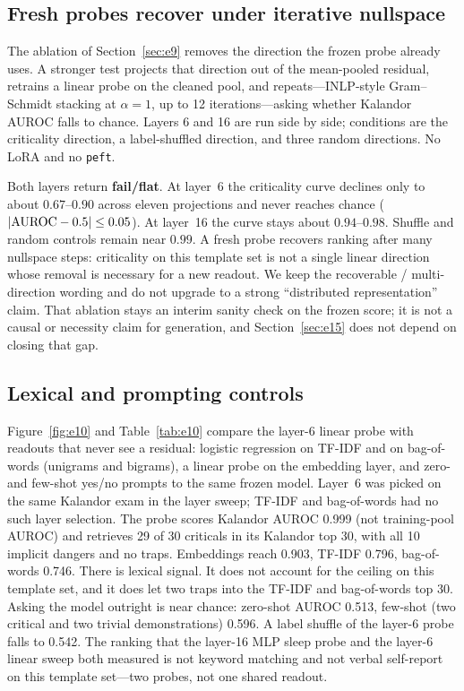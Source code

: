 \documentclass[11pt,a4paper]{article}
\begin{document}
\subsection{Fresh probes recover under iterative nullspace}
\label{sec:e14}

The ablation of Section~\ref{sec:e9} removes the direction the frozen probe already uses.
A stronger test projects that direction out of the mean-pooled residual, retrains a linear probe on the cleaned pool, and repeats---INLP-style Gram--Schmidt stacking at $\alpha{=}1$, up to 12 iterations---asking whether Kalandor AUROC falls to chance.
Layers 6 and 16 are run side by side; conditions are the criticality direction, a label-shuffled direction, and three random directions.
No LoRA and no \texttt{peft}.

Both layers return \textbf{fail/flat}.
At layer~6 the criticality curve declines only to about $0.67$--$0.90$ across eleven projections and never reaches chance ($|{\rm AUROC}-0.5|\leq 0.05$).
At layer~16 the curve stays about $0.94$--$0.98$.
Shuffle and random controls remain near $0.99$.
A fresh probe recovers ranking after many nullspace steps: criticality on this template set is not a single linear direction whose removal is necessary for a new readout.
We keep the recoverable / multi-direction wording and do not upgrade to a strong ``distributed representation'' claim.
That ablation stays an interim sanity check on the frozen score; it is not a causal or necessity claim for generation, and Section~\ref{sec:e15} does not depend on closing that gap.

\subsection{Lexical and prompting controls}
\label{sec:e10}

Figure~\ref{fig:e10} and Table~\ref{tab:e10} compare the layer-6 linear probe with readouts that never see a residual: logistic regression on TF-IDF and on bag-of-words (unigrams and bigrams), a linear probe on the embedding layer, and zero- and few-shot yes/no prompts to the same frozen model.
Layer~6 was picked on the same Kalandor exam in the layer sweep; TF-IDF and bag-of-words had no such layer selection.
The probe scores Kalandor AUROC 0.999 (not training-pool AUROC) and retrieves 29 of 30 criticals in its Kalandor top 30, with all 10 implicit dangers and no traps.
Embeddings reach 0.903, TF-IDF 0.796, bag-of-words 0.746.
There is lexical signal.
It does not account for the ceiling on this template set, and it does let two traps into the TF-IDF and bag-of-words top 30.
Asking the model outright is near chance: zero-shot AUROC 0.513, few-shot (two critical and two trivial demonstrations) 0.596.
A label shuffle of the layer-6 probe falls to 0.542.
The ranking that the layer-16 MLP sleep probe and the layer-6 linear sweep both measured is not keyword matching and not verbal self-report on this template set---two probes, not one shared readout.
\end{document}
